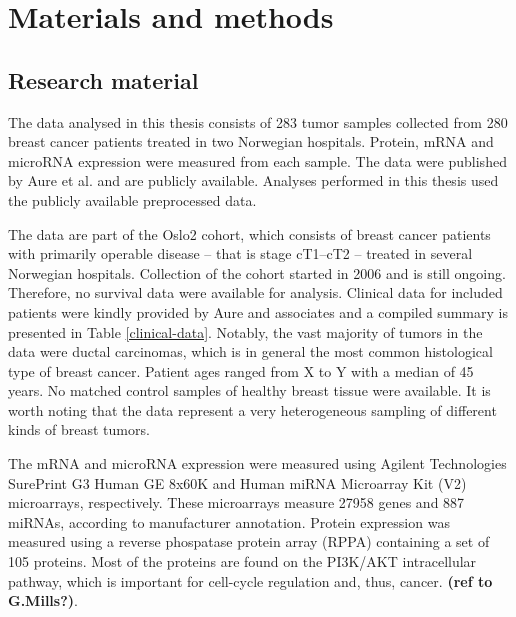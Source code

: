 

\section{Materials and methods}\label{materials-and-methods}

\subsection{Research material}

The data analysed in this thesis consists of 283 tumor samples collected from
280 breast cancer patients treated in two Norwegian hospitals. Protein, mRNA
and microRNA expression were measured from each sample. The data were
published by Aure et al. \citep{Aure2015} and are publicly available. Analyses
performed in this thesis used the publicly available preprocessed data.

The data are part of the Oslo2 cohort, which consists of breast cancer
patients with primarily operable disease -- that is stage cT1--cT2 -- treated
in several Norwegian hospitals. Collection of the cohort started in 2006 and
is still ongoing. Therefore, no survival data were available for analysis.
Clinical data for included patients were kindly provided by Aure and
associates and a compiled summary is presented in Table
\ref{clinical-data}. Notably, the vast majority of tumors in the data
were ductal carcinomas, which is in general the most common histological type
of breast cancer. Patient ages ranged from X to Y with a median of 45 years.
No matched control samples of healthy breast tissue were available.
It is worth noting that the data represent a very heterogeneous sampling
of different kinds of breast tumors.



The mRNA and microRNA expression were measured using Agilent Technologies
SurePrint G3 Human GE 8x60K and Human miRNA Microarray Kit (V2) microarrays,
respectively. These microarrays measure 27958 genes and 887 miRNAs, according
to manufacturer annotation. Protein expression was measured using a reverse
phospatase protein array (RPPA) containing a set of 105 proteins. Most of the
proteins are found on the PI3K/AKT intracellular pathway, which is important
for cell-cycle regulation and, thus, cancer. \textbf{(ref to G.Mills?)}.



